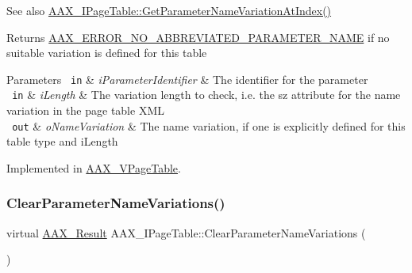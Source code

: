 \begin{DoxyItemize}
\item \begin{DoxySeeAlso}{See also}
\mbox{\hyperlink{a01849_adffe5a5f2ad548bd4c704508d816d568}{A\+A\+X\+\_\+\+I\+Page\+Table\+::\+Get\+Parameter\+Name\+Variation\+At\+Index()}}
\end{DoxySeeAlso}
\begin{DoxyReturn}{Returns}
\mbox{\hyperlink{a00494_a5f8c7439f3a706c4f8315a9609811937ab7383b0169f6dfa5f86b1fefd6c58ae2}{A\+A\+X\+\_\+\+E\+R\+R\+O\+R\+\_\+\+N\+O\+\_\+\+A\+B\+B\+R\+E\+V\+I\+A\+T\+E\+D\+\_\+\+P\+A\+R\+A\+M\+E\+T\+E\+R\+\_\+\+N\+A\+ME}} if no suitable variation is defined for this table
\end{DoxyReturn}

\begin{DoxyParams}[1]{Parameters}
\mbox{\texttt{ in}}  & {\em i\+Parameter\+Identifier} & The identifier for the parameter \\
\hline
\mbox{\texttt{ in}}  & {\em i\+Length} & The variation length to check, i.\+e. the {\ttfamily sz} attribute for the name variation in the page table X\+ML \\
\hline
\mbox{\texttt{ out}}  & {\em o\+Name\+Variation} & The name variation, if one is explicitly defined for this table type and {\ttfamily i\+Length} \\
\hline
\end{DoxyParams}

\end{DoxyItemize}

Implemented in \mbox{\hyperlink{a01929_a4b921a55a35d0a642dbcd4402544f0ee}{A\+A\+X\+\_\+\+V\+Page\+Table}}.

\mbox{\label{a01849_a6af3965eaf2baeadef9a44aa9c77ecbb}} 
\subsubsection{\texorpdfstring{ClearParameterNameVariations()}{ClearParameterNameVariations()}}
{\footnotesize\ttfamily virtual \mbox{\hyperlink{a00392_a4d8f69a697df7f70c3a8e9b8ee130d2f}{A\+A\+X\+\_\+\+Result}} A\+A\+X\+\_\+\+I\+Page\+Table\+::\+Clear\+Parameter\+Name\+Variations (\begin{DoxyParamCaption}{ }\end{DoxyParamCaption})\hspace{0.3cm}{\ttfamily [pure virtual]}}

